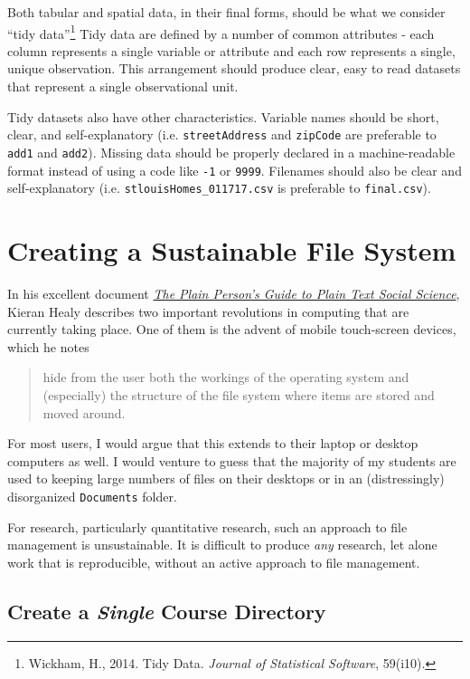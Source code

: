 \documentclass[]{book}
\let\rmarkdownfootnote\footnote%
\def\footnote{\protect\rmarkdownfootnote}
\theoremstyle{definition}
\theoremstyle{definition}
\theoremstyle{definition}
\theoremstyle{remark}
\begin{document}
Both tabular and spatial data, in their final forms, should be what we
consider ``tidy data''\footnote{Wickham, H., 2014. Tidy Data.
  \emph{Journal of Statistical Software}, 59(i10).} Tidy data are
defined by a number of common attributes - each column represents a
single variable or attribute and each row represents a single, unique
observation. This arrangement should produce clear, easy to read
datasets that represent a single observational unit.

Tidy datasets also have other characteristics. Variable names should be
short, clear, and self-explanatory (i.e. \texttt{streetAddress} and
\texttt{zipCode} are preferable to \texttt{add1} and \texttt{add2}).
Missing data should be properly declared in a machine-readable format
instead of using a code like \texttt{-1} or \texttt{9999}. Filenames
should also be clear and self-explanatory (i.e.
\texttt{stlouisHomes\_011717.csv} is preferable to \texttt{final.csv}).

\section{Creating a Sustainable File
System}\label{creating-a-sustainable-file-system}

In his excellent document \href{http://plain-text.co}{\emph{The Plain
Person's Guide to Plain Text Social Science}}, Kieran Healy describes
two important revolutions in computing that are currently taking place.
One of them is the advent of mobile touch-screen devices, which he notes

\begin{quote}
hide from the user both the workings of the operating system and
(especially) the structure of the file system where items are stored and
moved around.
\end{quote}

For most users, I would argue that this extends to their laptop or
desktop computers as well. I would venture to guess that the majority of
my students are used to keeping large numbers of files on their desktops
or in an (distressingly) disorganized \texttt{Documents} folder.

For research, particularly quantitative research, such an approach to
file management is unsustainable. It is difficult to produce \emph{any}
research, let alone work that is reproducible, without an active
approach to file management.

\subsection{\texorpdfstring{Create a \emph{Single} Course
Directory}{Create a Single Course Directory}}\label{create-a-single-course-directory}
\end{document}
